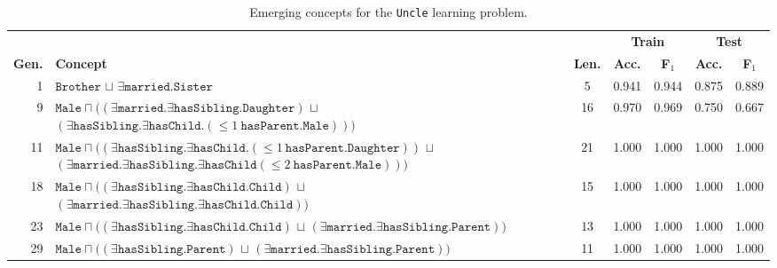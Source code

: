 \begin{table}[tb]
    \centering
    \caption{Emerging concepts for the \texttt{Uncle} learning problem.}%
    \label{tab:evaluation-example}
    \footnotesize
    \setlength{\tabcolsep}{2pt}
\begin{tabular}{@{}rlccccc@{}}
\toprule
  & & & \multicolumn{2}{c}{\textbf{Train}} & \multicolumn{2}{c}{\textbf{Test}} \\
  \cmidrule(lr){4-5} \cmidrule(lr){6-7}
  \textbf{Gen.} & \textbf{Concept} & \textbf{Len.} & \textbf{Acc.} & \textbf{F$_1$} & \textbf{Acc.} & \textbf{F$_1$} \\
  \midrule
  1 & $\texttt{Brother}$ $\sqcup$ $\exists \texttt{married.Sister}$ & 5 & 0.941 & 0.944 & 0.875 & 0.889 \\
  \midrule
  9 & $\texttt{Male} \sqcap ((\exists \texttt{married.}\exists\texttt{hasSibling.Daughter})$ $\sqcup $ $(\exists\texttt{hasSibling.}\exists\texttt{hasChild.}(  \leq 1 \  \texttt{hasParent.Male})))$ & 16 & 0.970 & 0.969 & 0.750 & 0.667\\
  \midrule
  11 & $\texttt{Male} \sqcap ((\exists \texttt{hasSibling.}\exists\texttt{hasChild.}(  \leq 1 \  \texttt{hasParent.Daughter}))$ $\sqcup $ $(\exists\texttt{married.}\exists\texttt{hasSibling.}\exists\texttt{hasChild}(  \leq 2 \  \texttt{hasParent.Male})))$ & 21 & 1.000 & 1.000 & 1.000 & 1.000 \\
  \midrule
  18 & $\texttt{Male} \sqcap ((\exists\texttt{hasSibling.}\exists \texttt{hasChild.Child})$ $\sqcup$  $(\exists\texttt{married.}\exists\texttt{hasSibling.} \exists\texttt{hasChild.Child}))$ & 15 & 1.000 & 1.000 & 1.000 & 1.000 \\
  \midrule
  23 & $\texttt{Male} \sqcap ((\exists\texttt{hasSibling.}\exists \texttt{hasChild.Child})$ $\sqcup$  $(\exists\texttt{married.}\exists\texttt{hasSibling.Parent}))$ & 13 & 1.000 & 1.000 & 1.000 & 1.000 \\
  \midrule  
  29 & $\texttt{Male} \sqcap ((\exists\texttt{hasSibling.Parent})$ $\sqcup$ $ (\exists\texttt{married.}\exists\texttt{hasSibling.Parent}))$ & 11 & 1.000 & 1.000 & 1.000 & 1.000 \\
\bottomrule
\end{tabular}
\end{table}
